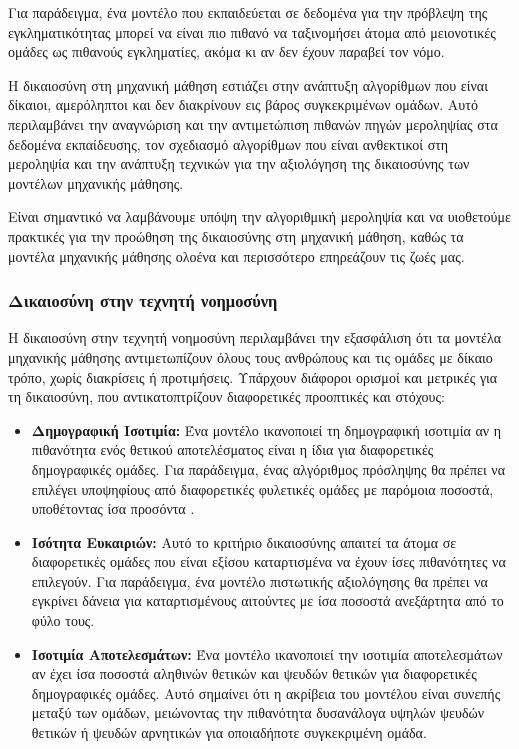 \documentclass[12pt,twoside]{article}
\newcommand{\gr}{\selectlanguage{greek}}
\begin{document}
{Για παράδειγμα, ένα μοντέλο που εκπαιδεύεται σε δεδομένα για την πρόβλεψη της εγκληματικότητας μπορεί να είναι πιο πιθανό να ταξινομήσει άτομα από μειονοτικές ομάδες ως πιθανούς εγκληματίες, ακόμα κι αν δεν έχουν παραβεί τον νόμο.

Η δικαιοσύνη στη μηχανική μάθηση εστιάζει στην ανάπτυξη αλγορίθμων που είναι δίκαιοι, αμερόληπτοι και δεν διακρίνουν εις βάρος συγκεκριμένων ομάδων. Αυτό περιλαμβάνει την αναγνώριση και την αντιμετώπιση πιθανών πηγών μεροληψίας στα δεδομένα εκπαίδευσης, τον σχεδιασμό αλγορίθμων που είναι ανθεκτικοί στη μεροληψία και την ανάπτυξη τεχνικών για την αξιολόγηση της δικαιοσύνης των μοντέλων μηχανικής μάθησης.

Είναι σημαντικό να λαμβάνουμε υπόψη την αλγοριθμική μεροληψία και να υιοθετούμε πρακτικές για την προώθηση της δικαιοσύνης στη μηχανική μάθηση, καθώς τα μοντέλα μηχανικής μάθησης ολοένα και περισσότερο επηρεάζουν τις ζωές μας.

\subsubsection{\gr Δικαιοσύνη στην τεχνητή νοημοσύνη}
\gr Η δικαιοσύνη στην τεχνητή νοημοσύνη περιλαμβάνει την εξασφάλιση ότι τα μοντέλα μηχανικής μάθησης αντιμετωπίζουν όλους τους ανθρώπους και τις ομάδες με δίκαιο τρόπο, χωρίς διακρίσεις ή προτιμήσεις. Υπάρχουν διάφοροι ορισμοί και μετρικές για τη δικαιοσύνη, που αντικατοπτρίζουν διαφορετικές προοπτικές και στόχους:

\begin{itemize}
    \item \textbf{\gr Δημογραφική Ισοτιμία:} \gr Ένα μοντέλο ικανοποιεί τη δημογραφική ισοτιμία αν η πιθανότητα ενός θετικού αποτελέσματος είναι η ίδια για διαφορετικές δημογραφικές ομάδες. Για παράδειγμα, ένας αλγόριθμος πρόσληψης θα πρέπει να επιλέγει υποψηφίους από διαφορετικές φυλετικές ομάδες με παρόμοια ποσοστά, υποθέτοντας ίσα προσόντα \citep{hardt2016equality}.
    \item \textbf{\gr Ισότητα Ευκαιριών:} \gr Αυτό το κριτήριο δικαιοσύνης απαιτεί τα άτομα σε διαφορετικές ομάδες που είναι εξίσου καταρτισμένα να έχουν ίσες πιθανότητες να επιλεγούν. Για παράδειγμα, ένα μοντέλο πιστωτικής αξιολόγησης θα πρέπει να εγκρίνει δάνεια για καταρτισμένους αιτούντες με ίσα ποσοστά ανεξάρτητα από το φύλο τους.
    \item \textbf{\gr Ισοτιμία Αποτελεσμάτων:} \gr Ένα μοντέλο ικανοποιεί την ισοτιμία αποτελεσμάτων αν έχει ίσα ποσοστά αληθινών θετικών και ψευδών θετικών για διαφορετικές δημογραφικές ομάδες. Αυτό σημαίνει ότι η ακρίβεια του μοντέλου είναι συνεπής μεταξύ των ομάδων, μειώνοντας την πιθανότητα δυσανάλογα υψηλών ψευδών θετικών ή ψευδών αρνητικών για οποιαδήποτε συγκεκριμένη ομάδα.
\end{itemize}

}
\end{document}
